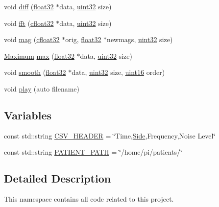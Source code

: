 \begin{DoxyCompactItemize}
void \hyperlink{namespaceavda_a3e9b92cfa9d76c4c363e8ed8a4c1a2ce}{diff} (\hyperlink{definitions_8hpp_aacdc525d6f7bddb3ae95d5c311bd06a1}{float32} $\ast$data, \hyperlink{definitions_8hpp_a1134b580f8da4de94ca6b1de4d37975e}{uint32} size)
\item 
void \hyperlink{namespaceavda_a33a1102422421212ac6b9387c896e864}{fft} (\hyperlink{definitions_8hpp_a960be6b6614c08090c16574dba10a421}{cfloat32} $\ast$data, \hyperlink{definitions_8hpp_a1134b580f8da4de94ca6b1de4d37975e}{uint32} size)
\item 
void \hyperlink{namespaceavda_a213bd6384fc9a330e4db2cecdbcd73ee}{mag} (\hyperlink{definitions_8hpp_a960be6b6614c08090c16574dba10a421}{cfloat32} $\ast$orig, \hyperlink{definitions_8hpp_aacdc525d6f7bddb3ae95d5c311bd06a1}{float32} $\ast$newmags, \hyperlink{definitions_8hpp_a1134b580f8da4de94ca6b1de4d37975e}{uint32} size)
\item 
\hyperlink{structMaximum}{Maximum} \hyperlink{namespaceavda_aa82021c3ee552773c060b1a39caf8aaa}{max} (\hyperlink{definitions_8hpp_aacdc525d6f7bddb3ae95d5c311bd06a1}{float32} $\ast$data, \hyperlink{definitions_8hpp_a1134b580f8da4de94ca6b1de4d37975e}{uint32} size)
\item 
void \hyperlink{namespaceavda_a22583ba7f11b69c955b13155bf9a739d}{smooth} (\hyperlink{definitions_8hpp_aacdc525d6f7bddb3ae95d5c311bd06a1}{float32} $\ast$data, \hyperlink{definitions_8hpp_a1134b580f8da4de94ca6b1de4d37975e}{uint32} size, \hyperlink{definitions_8hpp_a05f6b0ae8f6a6e135b0e290c25fe0e4e}{uint16} order)
\item 
void \hyperlink{namespaceavda_a34f661f9a357bb68b0aa3662cc821e4d}{play} (auto filename)
\end{DoxyCompactItemize}
\subsection*{Variables}
\begin{DoxyCompactItemize}
\item 
const std\+::string \hyperlink{namespaceavda_ac568a0872c2c176d874b8b12f67f43ea}{C\+S\+V\+\_\+\+H\+E\+A\+D\+E\+R} = \char`\"{}Time,\hyperlink{namespaceavda_af723e82f0d3d45fda6fdc01f6a492786}{Side},Frequency,Noise Level\char`\"{}
\item 
const std\+::string \hyperlink{namespaceavda_a8ee73ec0cb55d4a13e89949764dce89d}{P\+A\+T\+I\+E\+N\+T\+\_\+\+P\+A\+T\+H} = \char`\"{}/home/pi/patients/\char`\"{}
\end{DoxyCompactItemize}


\subsection{Detailed Description}
This namespace contains all code related to this project. 

